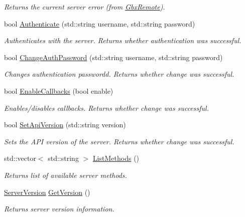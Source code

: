\begin{DoxyCompactItemize}
\begin{DoxyCompactList}\small\item\em Returns the current server error (from \hyperlink{classGbxRemote}{Gbx\-Remote}). \end{DoxyCompactList}\item 
bool \hyperlink{classMethods_aa1bba4d023f013fedf3edff7c69f5d08}{Authenticate} (std\-::string username, std\-::string password)
\begin{DoxyCompactList}\small\item\em Authenticates with the server. Returns whether authentication was successful. \end{DoxyCompactList}\item 
bool \hyperlink{classMethods_a6bef98053e6d6d4f80557be7ce841e80}{Change\-Auth\-Password} (std\-::string username, std\-::string password)
\begin{DoxyCompactList}\small\item\em Changes authentication passwordd. Returns whether change was successful. \end{DoxyCompactList}\item 
bool \hyperlink{classMethods_a9f47416487f6a825133c2d1e01287956}{Enable\-Callbacks} (bool enable)
\begin{DoxyCompactList}\small\item\em Enables/disables callbacks. Returns whether change was successful. \end{DoxyCompactList}\item 
bool \hyperlink{classMethods_ad31d717a19f95d4213d6882a0caff0fa}{Set\-Api\-Version} (std\-::string version)
\begin{DoxyCompactList}\small\item\em Sets the A\-P\-I version of the server. Returns whether change was successful. \end{DoxyCompactList}\item 
std\-::vector$<$ std\-::string $>$ \hyperlink{classMethods_a7833782aa64f9072db30809552f83eef}{List\-Methods} ()
\begin{DoxyCompactList}\small\item\em Returns list of available server methods. \end{DoxyCompactList}\item 
\hyperlink{structServerVersion}{Server\-Version} \hyperlink{classMethods_a674b7c1f53296dca78fb14896b374e1e}{Get\-Version} ()
\begin{DoxyCompactList}\small\item\em Returns server version information. \end{DoxyCompactList}\item 

\end{DoxyCompactItemize}
